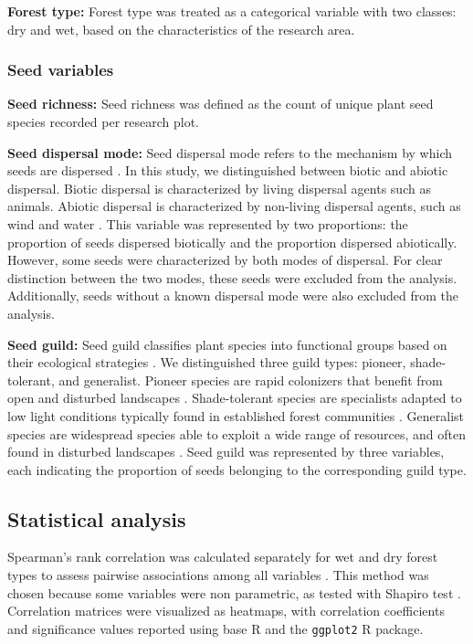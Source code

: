 \textbf{Forest type:} Forest type was treated as a categorical variable with two classes: dry and wet, based on the characteristics of the research area.



\subsubsection{Seed variables}

\textbf{Seed richness:} Seed richness was defined as the count of unique plant seed species recorded per research plot.

\textbf{Seed dispersal mode:}
Seed dispersal mode refers to the mechanism by which seeds are dispersed \citep{dentUnitingNicheDifferentiation2021}. In this study, we distinguished between biotic and abiotic dispersal. Biotic dispersal is characterized by living dispersal agents such as animals. Abiotic dispersal is characterized by non-living dispersal agents, such as wind and water \citep{hordijkLandUseHistory2024}. This variable was represented by two proportions: the proportion of seeds dispersed biotically and the proportion dispersed abiotically. However, some seeds were characterized by both modes of dispersal. For clear distinction between the two modes, these seeds were excluded from the analysis. Additionally, seeds without a known dispersal mode were also excluded from the analysis.

\textbf{Seed guild:} Seed guild classifies plant species into functional groups based on their ecological strategies \citep{blondelGuildsFunctionalGroups2003}. We distinguished three guild types: pioneer, shade-tolerant, and generalist. Pioneer species are rapid colonizers that benefit from open and disturbed
landscapes \cite{poorterComprehensiveFrameworkVegetation2024}. Shade-tolerant species are specialists adapted to low light conditions
typically found in established forest communities \citep{dentUnitingNicheDifferentiation2021}. Generalist
species are widespread species able to exploit a wide range of resources, and often found in disturbed landscapes \citep{poorterComprehensiveFrameworkVegetation2024}. Seed guild was represented by three variables, each indicating the proportion of seeds belonging to the corresponding guild type.  \\







\subsection{Statistical analysis}
Spearman’s rank correlation was calculated separately for wet and dry forest types to assess pairwise associations among all variables \citep{bishara2012testing}. This method was chosen because some variables were non parametric, as tested with Shapiro test \citep{shapiro1972approximate}. Correlation matrices were visualized as heatmaps, with correlation coefficients and significance values reported using base R and the \texttt{ggplot2} R package.
 
